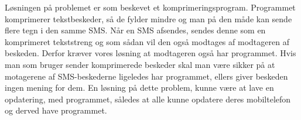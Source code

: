 Løsningen på problemet er som beskevet et komprimeringsprogram. Programmet komprimerer tekstbeskeder, så de fylder mindre og man på den måde kan sende flere tegn i den samme SMS. Når en SMS afsendes, sendes denne som en komprimeret tekststreng og som sådan vil den også modtages af modtageren af beskeden. Derfor kræver vores løsning at modtageren også har programmet. Hvis man som bruger sender komprimerede beskeder skal man være sikker på at motagerene af SMS-beskederne ligeledes har programmet, ellers giver beskeden ingen mening for dem. En løsning på dette problem, kunne være at lave en opdatering, med programmet, således at alle kunne opdatere deres mobiltelefon og derved have programmet. 